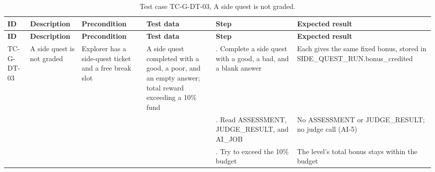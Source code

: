 {\footnotesize{}\renewcommand{\arraystretch}{1.1}
\begin{longtable}{|>{\raggedright\arraybackslash}p{}|>{\raggedright\arraybackslash}p{}|>{\raggedright\arraybackslash}p{}|>{\raggedright\arraybackslash}p{}|>{\raggedright\arraybackslash}p{}|>{\raggedright\arraybackslash}p{}|}
\caption{Test case TC-G-DT-03, A side quest is not graded.} \\
\hline
\textbf{ID} & \textbf{Description} & \textbf{Precondition} & \textbf{Test data} & \textbf{Step} & \textbf{Expected result} \\ \hline
\endfirsthead
\hline
\textbf{ID} & \textbf{Description} & \textbf{Precondition} & \textbf{Test data} & \textbf{Step} & \textbf{Expected result} \\ \hline
\endhead
TC-G-DT-03 & A side quest is not graded & Explorer has a side-quest ticket and a free break slot & A side quest completed with a good, a poor, and an empty answer; total reward exceeding a 10\% fund & 1. Complete a side quest with a good, a bad, and a blank answer & Each gives the same fixed bonus, stored in SIDE\_\allowbreak{}QUEST\_\allowbreak{}RUN.\allowbreak{}bonus\_\allowbreak{}credited \\ \cline{5-6}
 &  &  &  & 2. Read ASSESSMENT, JUDGE\_\allowbreak{}RESULT, and AI\_JOB & No ASSESSMENT or JUDGE\_\allowbreak{}RESULT; no judge call (AI-5) \\ \cline{5-6}
 &  &  &  & 3. Try to exceed the 10\% budget & The level's total bonus stays within the budget \\ \hline
\end{longtable}
}


